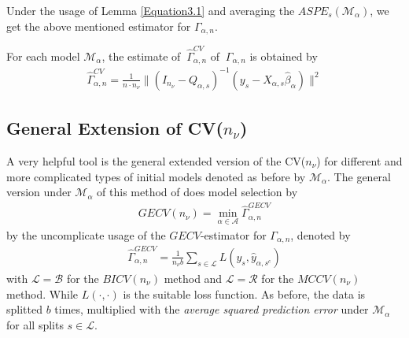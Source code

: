 \documentclass[Research_Module_ES.tex]{subfiles}
\begin{document}
Under the usage of Lemma \ref{Equation3.1} and averaging the $ASPE_{s}(\mathcal{M}_\alpha)$, we get the above mentioned estimator for $\Gamma_{\alpha,n}$.
\begin{lemma}
	For each model $\mathcal{M}_\alpha$, the estimate of $~\hat{\Gamma}_{\alpha,n}^{CV}$ of $~\Gamma_{\alpha,n}$ is obtained by
	\begin{align*}
		\hat{\Gamma}_{\alpha,n}^{CV}=\frac{1}{n \cdot n_\nu}\parallel (I_{n_\nu}-Q_{\alpha,s})^{-1}(y_s-X_{\alpha,s}\hat{\beta}_\alpha)\parallel^2
	\end{align*}
	
\end{lemma}


	







\subsection{General Extension of CV($n_\nu$)}
A very helpful tool is the general extended version of the CV($n_\nu$) for different and more complicated types of initial models denoted as before by $\mathcal{M}_\alpha$. The general version under $\mathcal{M}_\alpha$ of this method of \cite{shao} does model selection by 
\begin{align*}
	GECV(n_\nu)=\min_{\alpha\in\mathcal{A}}\hat{\Gamma}_{\alpha,n}^{GECV}
\end{align*}
by the uncomplicate usage of the $GECV$-estimator for $\Gamma_{\alpha,n}$, denoted by
\begin{align*}
	\hat{\Gamma}_{\alpha,n}^{GECV}=\frac{1}{n_\nu b}\sum_{s\in\mathcal{L}}L(y_s,\hat{y}_{\alpha,s^c})
\end{align*} 
with $\mathcal{L}=\mathcal{B}$ for the $BICV(n_\nu)$ method and $\mathcal{L}=\mathcal{R}$ for the $MCCV(n_\nu)$ method. While $L(\cdot,\cdot)$ is the suitable loss function. As before, the data is splitted $b$ times, multiplied with the \textit{average squared prediction error} under $\mathcal{M}_\alpha$ for all splits $s\in\mathcal{L}$.
\end{document}
